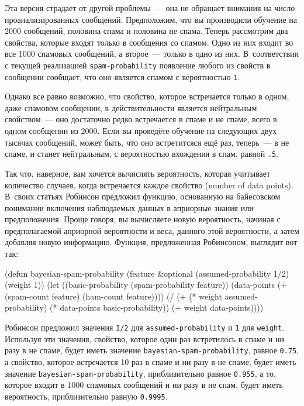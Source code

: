 Эта версия страдает от другой проблемы~--- она не обращает внимания на число
проанализированных сообщений.  Предположим, что вы производили обучение на 2000 сообщений,
половина спама и половина не спама.  Теперь рассмотрим два свойства, которые входят только
в сообщения со спамом.  Одно из них входит во все 1000 спамовых сообщений, а второе~---
только в одно из них.  В~соответствии с текущей реализацией \lstinline{spam-probability}
появление любого из свойств в сообщении сообщает, что оно является спамом с вероятностью
\lstinline{1}.

Однако все равно возможно, что свойство, которое встречается только в одном, даже
спамовом сообщении, в действительности является нейтральным свойством~--- оно достаточно
редко встречается в спаме и не спаме, всего в одном сообщении из 2000.  Если вы проведёте
обучение на следующих двух тысячах сообщений, может быть, что оно встретитсяся ещё раз,
теперь~--- в не спаме, и станет нейтральным, с вероятностью вхождения в спам, равной
\lstinline{.5}.

Так что, наверное, вам хочется вычислять вероятность, которая учитывает количество
случаев, когда встречается каждое свойство (number of data points).  В~своих статьях
Робинсон предложил функцию, основанную на байесовском понимании включения наблюдаемых
данных в априорные знания или предположения. Проще говоря, вы вычисляете новую вероятность,
начиная с предполагаемой априорной вероятности и веса, данного этой вероятности, а затем
добавляя новую информацию. Функция, предложенная Робинсоном, выглядит вот так:

\begin{myverb}
(defun bayesian-spam-probability (feature &optional
                                  (assumed-probability 1/2)
                                  (weight 1))
  (let ((basic-probability (spam-probability feature))
        (data-points (+ (spam-count feature) (ham-count feature))))
    (/ (+ (* weight assumed-probability)
          (* data-points basic-probability))
       (+ weight data-points))))
\end{myverb}

Робинсон предложил значения \lstinline{1/2} для \lstinline{assumed-probability} и \lstinline{1} для
\lstinline{weight}.  Используя эти значения, свойство, которое один раз встретилось в спаме и
ни разу в не спаме, будет иметь значение \lstinline{bayesian-spam-probability}, равное
\lstinline{0.75}, а свойство, которое встречается 10 раз в спаме и ни разу в не спаме, будет
иметь значение \lstinline{bayesian-spam-probability}, приблизительно равное \lstinline{0.955}, а то,
которое входит в 1000 спамовых сообщений и ни разу в не спам, будет иметь вероятность,
приблизительно равную \lstinline{0.9995}.

